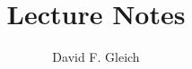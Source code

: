 \providecommand{\ones}{\vec{e}}
\providecommand{\va}{\ensuremath{\vec{a}}}
\providecommand{\vb}{\ensuremath{\vec{b}}}
\providecommand{\vc}{\ensuremath{\vec{c}}}
\providecommand{\vd}{\ensuremath{\vec{d}}}
\providecommand{\ve}{\ensuremath{\vec{e}}}
\providecommand{\vf}{\ensuremath{\vec{f}}}
\providecommand{\vg}{\ensuremath{\vec{g}}}
\providecommand{\vh}{\ensuremath{\vec{h}}}
\providecommand{\vi}{\ensuremath{\vec{i}}}
\providecommand{\vj}{\ensuremath{\vec{j}}}
\providecommand{\vk}{\ensuremath{\vec{k}}}
\providecommand{\vl}{\ensuremath{\vec{l}}}
\providecommand{\vm}{\ensuremath{\vec{l}}}
\providecommand{\vn}{\ensuremath{\vec{n}}}
\providecommand{\vo}{\ensuremath{\vec{o}}}
\providecommand{\vp}{\ensuremath{\vec{p}}}
\providecommand{\vq}{\ensuremath{\vec{q}}}
\providecommand{\vr}{\ensuremath{\vec{r}}}
\providecommand{\vs}{\ensuremath{\vec{s}}}
\providecommand{\vt}{\ensuremath{\vec{t}}}
\providecommand{\vu}{\ensuremath{\vec{u}}}
\providecommand{\vv}{\ensuremath{\vec{v}}}
\providecommand{\vw}{\ensuremath{\vec{w}}}
\providecommand{\vx}{\ensuremath{\vec{x}}}
\providecommand{\vy}{\ensuremath{\vec{y}}}
\providecommand{\vz}{\ensuremath{\vec{z}}}
\providecommand{\vpi}{\ensuremath{\vecalt{\pi}}}

\sodef\allcapsspacing{\upshape}{0.15em}{0.65em}{0.6em}%

\makeatletter
\def\maketitle{%
\par
\hrule height 0.75pt\vspace{1ex}
\par\noindent
\begin{minipage}{0.5\textwidth}
\scshape
purdue university $\cdot$ cs 51400 \\
numerical analysis
\end{minipage}
\begin{minipage}{0.5\textwidth}
\raggedleft
\MakeTextUppercase{\allcapsspacing{\@title}}\\[0.2ex]
\textit{\@author}\\[0.2ex]
\textit{\@date}
\end{minipage}
\par\vspace{1ex}
\hrule height 1pt
\vspace{2ex}
\par
}
\makeatother

\author{David F. Gleich}
\title{Lecture Notes}
